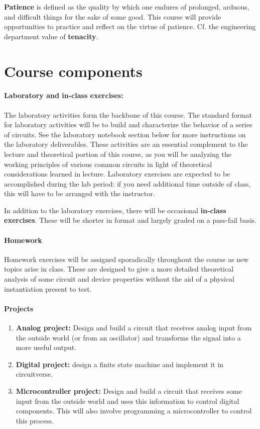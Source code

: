 \documentclass{syllabus}
\begin{document}
\textbf{Patience} is defined as the quality by which one endures of prolonged, arduous, and difficult things for the sake of some good. This course will provide opportunities to practice and reflect on the virtue of patience. Cf. the engineering department value of \textbf{tenacity}.

\section*{Course components}

\paragraph*{Laboratory and in-class exercises: }
The laboratory activities form the backbone of this course. The standard format for laboratory activities will be to build and characterize the behavior of a series of circuits. See the laboratory notebook section below for more instructions on the laboratory deliverables. These activities are an essential complement to the lecture and theoretical portion of this course, as you will be analyzing the working principles of various common circuits in light of theoretical considerations learned in lecture. Laboratory exercises are expected to be accomplished during the lab period: if you need additional time outside of class, this will have to be arranged with the instructor.

In addition to the laboratory exercises, there will be occasional \textbf{in-class exercises}. These will be shorter in format and largely graded on a pass-fail basis.

\paragraph{Homework} 
Homework exercises will be assigned sporadically throughout the course as new topics arise in class. These are designed to give a more detailed theoretical analysis of some circuit and device properties without the aid of a physical instantiation present to test. 

\paragraph{Projects}
\begin{enumerate}[label=\textcolor{CarthageDark}{\bfseries\arabic*.}]
\item \textbf{Analog project:} Design and build a circuit that receives analog input from the outside world (or from an oscillator) and transforms the signal into a more useful output.
\item \textbf{Digital project:} design a finite state machine and implement it in circuitverse. 
\item \textbf{Microcontroller project:} Design and build a circuit that receives some input from the outside world and uses this information to control digital components. This will also involve programming a microcontroller to control this process.
\end{enumerate}
\end{document}

